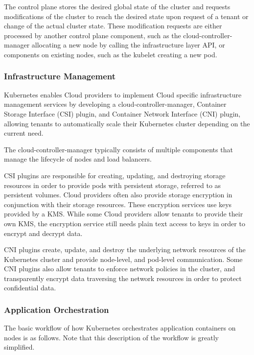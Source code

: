\begin{description}
    The control plane stores the desired global state of the cluster and
    requests modifications of the cluster to reach the desired state upon
    request of a tenant or change of the actual cluster state. These
    modification requests are either processed by another control plane
    component, such as the cloud-controller-manager allocating a new node by
    calling the infrastructure layer API, or components on existing nodes, such
    as the kubelet creating a new pod.
\end{description}

\subsubsection{Infrastructure Management}

Kubernetes enables Cloud providers to implement Cloud specific infrastructure
management services by developing a cloud-controller-manager, Container Storage
Interface (CSI) plugin, and Container Network Interface (CNI) plugin, allowing
tenants to automatically scale their Kubernetes cluster depending on the current
need.

The cloud-controller-manager typically consists of multiple components that
manage the lifecycle of nodes and load balancers.

CSI plugins are responsible for creating, updating, and destroying storage
resources in order to provide pods with persistent storage, referred to as
persistent volumes. Cloud providers often also provide storage encryption in
conjunction with their storage resources. These encryption services use keys
provided by a KMS. While some Cloud providers allow tenants to provide their own
KMS, the encryption service still needs plain text access to keys in order to
encrypt and decrypt data.

CNI plugins create, update, and destroy the underlying network resources of the
Kubernetes cluster and provide node-level, and pod-level communication. Some CNI
plugins also allow tenants to enforce network policies in the cluster, and
transparently encrypt data traversing the network resources in order to protect
confidential data.

\subsubsection{Application Orchestration}

The basic workflow of how Kubernetes orchestrates application containers on
nodes is as follows. Note that this description of the workflow is greatly
simplified.

